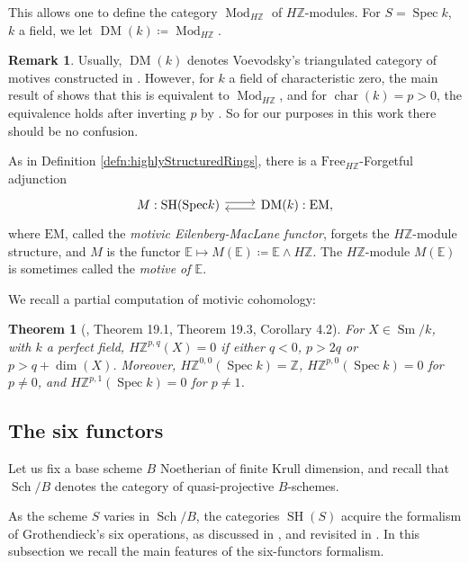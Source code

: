 \documentclass[10pt]{amsart}
\theoremstyle{definition}
\newtheorem{rmk}[defn]{Remark}
\theoremstyle{plain}
\newtheorem{thm}[defn]{Theorem}
\numberwithin{equation}{section}
\newcommand{\0}{\emptyset}
\newcommand{\E}{{\mathbb E}}
\newcommand{\Z}{{\mathbb Z}}
\newcommand{\Spec}{{\operatorname{Spec}}}
\newcommand{\SH}{{\operatorname{SH}}}
\newcommand{\DM}{{\operatorname{DM}}}
\newcommand{\Sm}{{\operatorname{Sm}}}
\renewcommand{\dim}{{\operatorname{dim}}}
\newcommand{\Mod}{{\operatorname{Mod}}}
\newcommand{\chr}{{\operatorname{char}}}
\newcommand{\Sch}{{\operatorname{Sch}}}
\begin{document}
This allows one to define the category $\Mod_{H\Z}$ of $H\Z$-modules. For $S=\Spec k$, $k$ a field, we let $\DM(k) \coloneqq \Mod_{H\Z}$.

\begin{rmk}
     Usually, $\DM(k)$ denotes Voevodsky's triangulated category of motives constructed in \cite{voev:MotivicHomology}. However, for $k$ a field of characteristic zero, the main result of \cite{rond:modules} shows that this is equivalent to $\Mod_{H\Z}$, and for $\chr(k)=p >0$, the equivalence holds after inverting $p$ by \cite[Theorem 5.8]{Hoy:Steenrod}. So for our purposes in this work there should be no confusion.
\end{rmk}

As in Definition \ref{defn:highlyStructuredRings}, there is a $\text{Free}_{H\Z}$-Forgetful adjunction 
$$\begin{tikzcd}
    M:\SH(\Spec k) \arrow[r, shift left] & \DM(k): \text{EM}, \arrow[l, shift left]
\end{tikzcd}
$$
where $\text{EM}$, called the \emph{motivic Eilenberg-MacLane functor}, forgets the $H\Z$-module structure, and $M$ is the functor $\E \mapsto M(\E)\coloneqq \E \wedge H\Z$. The $H\Z$-module $M(\E)$ is sometimes called the \emph{motive of $\E$}.

We recall a partial computation of motivic cohomology:

\begin{thm}[\cite{MazWei:lectures}, Theorem 19.1, Theorem 19.3, Corollary 4.2]
\label{thm:MazWeiHZ}
    For $X \in \Sm/k$, with $k$ a perfect field, $H\Z^{p,q}(X)=0$ if either $q<0$, $p > 2q$ or $p>q +\dim(X)$. Moreover, $H\Z^{0,0}(\Spec k)=\Z$, $H\Z^{p,0}(\Spec k)=0$ for $p \neq 0$, and $H\Z^{p,1}(\Spec k)=0$ for $p \neq 1$.
\end{thm}

 \subsection{The six functors}

Let us fix a base scheme $B$ Noetherian of finite Krull dimension, and recall that $\Sch/B$ denotes the category of quasi-projective $B$-schemes.

As the scheme $S$ varies in $\Sch/B$, the categories $\SH(S)$ acquire the formalism of Grothendieck's six operations, as discussed in \cite{ayoub:sixfunctors}, and revisited in \cite{deglise:mixmot}. In this subsection we recall the main features of the six-functors formalism.
\end{document}
